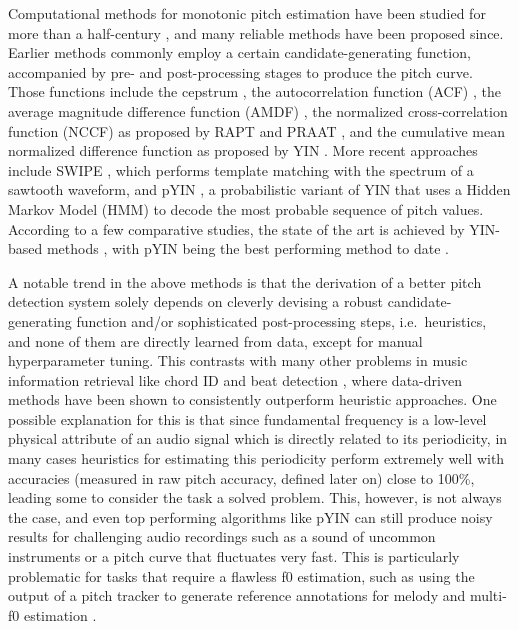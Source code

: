 Computational methods for monotonic pitch estimation have been studied for more than a half-century \cite{noll1967cepstrum}, and many reliable methods have been proposed since.
Earlier methods commonly employ a certain candidate-generating function, accompanied by pre- and post-processing stages to produce the pitch curve.
Those functions include the cepstrum \cite{noll1967cepstrum}, the autocorrelation function (ACF) \cite{dubnowski1976acf}, the average magnitude difference function (AMDF) \cite{ross1974amdf}, the normalized cross-correlation function (NCCF) as proposed by RAPT \cite{talkin1995rapt} and PRAAT \cite{boersma1993praat}, and the cumulative mean normalized difference function as proposed by YIN \cite{decheveigne2002yin}. More recent approaches include SWIPE \cite{camacho2008swipe}, which performs template matching with the spectrum of a sawtooth waveform, and 
pYIN \cite{mauch2014pyin}, a probabilistic variant of YIN that uses a Hidden Markov Model (HMM) to decode the most probable sequence of pitch values.
According to a few comparative studies, the state of the art is achieved by YIN-based methods \cite{von2010comparison, babacan2013comparative}, with pYIN being the best performing method to date \cite{mauch2014pyin}.

A notable trend in the above methods is that the derivation of a better pitch detection system solely depends on cleverly devising a robust candidate-generating function and/or sophisticated post-processing steps, i.e.~heuristics, and none of them are directly learned from data, except for manual hyperparameter tuning.
This contrasts with many other problems in music information retrieval like chord ID \cite{humphrey2012rethinking} and beat detection \cite{bock2011enhanced}, where data-driven methods have been shown to consistently outperform heuristic approaches.
One possible explanation for this is that since fundamental frequency is a low-level physical attribute of an audio signal which is directly related to its periodicity, in many cases heuristics for estimating this periodicity perform extremely well with accuracies (measured in raw pitch accuracy, defined later on) close to 100\%, leading some to consider the task a solved problem.
This, however, is not always the case, and even top performing algorithms like pYIN can still produce noisy results for challenging audio recordings such as a sound of uncommon instruments or a pitch curve that fluctuates very fast.
This is particularly problematic for tasks that require a flawless f0 estimation, such as using the output of a pitch tracker to generate reference annotations for melody and multi-f0 estimation \cite{salamon2017analysis,bittner2017deepsalience}.

